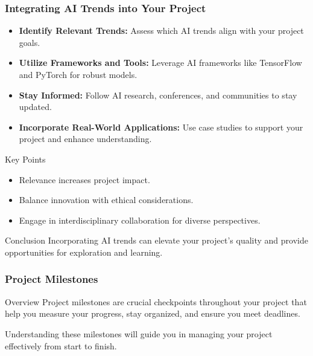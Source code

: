 \documentclass[aspectratio=169]{beamer}
\begin{document}
\begin{frame}[fragile]
    \frametitle{Integrating AI Trends into Your Project}
    \begin{itemize}
        \item \textbf{Identify Relevant Trends:} Assess which AI trends align with your project goals.
        \item \textbf{Utilize Frameworks and Tools:} Leverage AI frameworks like TensorFlow and PyTorch for robust models.
        \item \textbf{Stay Informed:} Follow AI research, conferences, and communities to stay updated.
        \item \textbf{Incorporate Real-World Applications:} Use case studies to support your project and enhance understanding.
    \end{itemize}
    
    \begin{block}{Key Points}
        \begin{itemize}
            \item Relevance increases project impact.
            \item Balance innovation with ethical considerations.
            \item Engage in interdisciplinary collaboration for diverse perspectives.
        \end{itemize}
    \end{block}

    \begin{block}{Conclusion}
        Incorporating AI trends can elevate your project's quality and provide opportunities for exploration and learning.
    \end{block}
\end{frame}

\begin{frame}[fragile]
    \frametitle{Project Milestones}
    \begin{block}{Overview}
        Project milestones are crucial checkpoints throughout your project that help you measure your progress, stay organized, and ensure you meet deadlines.
    \end{block}
    Understanding these milestones will guide you in managing your project effectively from start to finish.
\end{frame}
\end{document}
